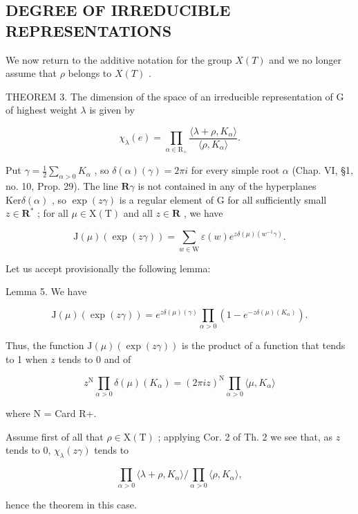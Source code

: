 \subsection{DEGREE OF IRREDUCIBLE REPRESENTATIONS}

We now return to the additive notation for the group \(X(T)\) and we no longer assume that \(\rho\) belongs to \(X(T)\) .

THEOREM 3. The dimension of the space of an irreducible representation of G of highest weight \(\lambda\) is given by

\[
\chi_ {\lambda} (e) = \prod_ {\alpha \in \mathrm{R} _ {+}} \frac {\langle \lambda + \rho , K _ {\alpha} \rangle}{\langle \rho , K _ {\alpha} \rangle}.
\]

Put \(\gamma = \frac{1}{2}\sum_{\alpha >0}K_{\alpha}\) , so \(\delta (\alpha)(\gamma) = 2\pi i\) for every simple root \(\alpha\) (Chap. VI, §1, no. 10, Prop. 29). The line \(\mathbf{R}\gamma\) is not contained in any of the hyperplanes \(\mathrm{Ker}\delta (\alpha)\) , so \(\exp (z\gamma)\) is a regular element of G for all sufficiently small \(z\in \mathbf{R}^*\) ; for all \(\mu \in \mathrm{X(T)}\) and all \(z\in \mathbf{R}\) , we have

\[
\mathrm{J} (\mu) (\exp (z \gamma)) = \sum_ {w \in \mathrm{W}} \varepsilon (w) e ^ {z \delta (\mu) (w ^ {- 1} \gamma)}.
\]

Let us accept provisionally the following lemma:

Lemma 5. We have

\[
\mathrm{J} (\mu) (\exp (z \gamma)) = e ^ {z \delta (\mu) (\gamma)} \prod_ {\alpha > 0} (1 - e ^ {- z \delta (\mu) (K _ {\alpha})}).
\]

Thus, the function \(\mathrm{J}(\mu)(\exp (z\gamma))\) is the product of a function that tends to 1 when \(z\) tends to 0 and of

\[
z ^ {\mathrm{N}} \prod_ {\alpha > 0} \delta (\mu) (K _ {\alpha}) = (2 \pi i z) ^ {\mathrm{N}} \prod_ {\alpha > 0} \langle \mu , K _ {\alpha} \rangle
\]

where N = Card R+.

Assume first of all that \(\rho \in \mathrm{X(T)}\) ; applying Cor. 2 of Th. 2 we see that, as \(z\) tends to 0, \(\chi_{\lambda}(z\gamma)\) tends to

\[
\prod_ {\alpha > 0} \langle \lambda + \rho , K _ {\alpha} \rangle / \prod_ {\alpha > 0} \langle \rho , K _ {\alpha} \rangle ,
\]

hence the theorem in this case.


